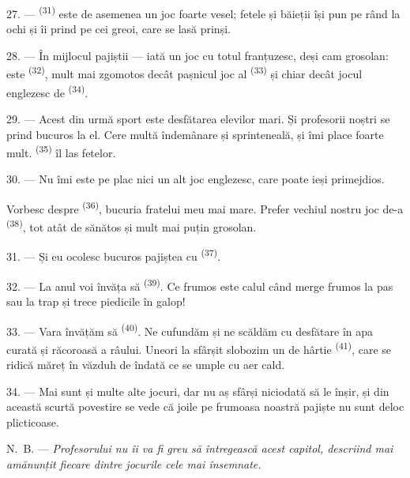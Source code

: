 27. ---  \textsuperscript{(31)} este de asemenea un joc foarte
vesel; fetele și băieții își pun pe rând  la ochi și îi prind pe
cei greoi, care se lasă prinși.

28. --- În mijlocul pajiștii --- iată un joc cu totul franțuzesc, deși cam
grosolan: este  \textsuperscript{(32)}, mult mai zgomotos decât
pașnicul joc al  \textsuperscript{(33)} și chiar decât jocul
englezesc de  \textsuperscript{(34)}.

29. --- Acest din urmă sport este desfătarea elevilor mari. Și profesorii noștri
se prind bucuros la el. Cere multă îndemânare și sprinteneală, și îmi place foarte
mult.  \textsuperscript{(35)} îl las fetelor.

30. --- Nu îmi este pe plac nici un alt joc englezesc, care poate ieși
primejdios.

Vorbesc despre  \textsuperscript{(36)}, bucuria fratelui meu mai
mare. Prefer vechiul nostru joc de-a  \textsuperscript{(38)}, tot
atât de sănătos și mult mai puțin grosolan.

\VUsaut{4.6mm}
\VUsaut{3.0mm}

31. --- Și eu ocolesc bucuros pajiștea cu 
\textsuperscript{(37)}.

32. --- La anul voi învăța să  \textsuperscript{(39)}. Ce frumos
este calul când merge frumos la pas sau la trap și trece piedicile în galop!

33. --- Vara învățăm să  \textsuperscript{(40)}. Ne cufundăm și ne
scăldăm cu desfătare în apa curată și răcoroasă a râului. Uneori la sfârșit
slobozim un  de hârtie \textsuperscript{(41)}, care se ridică
măreț în văzduh de îndată ce se umple cu aer cald.

34. --- Mai sunt și multe alte jocuri, dar nu aș sfârși niciodată să le înșir, și
din această scurtă povestire se vede că joile pe frumoasa noastră pajiște nu sunt
deloc plicticoase.

N.~B. --- \textit{Profesorului nu îi va fi greu să întregească acest capitol,
descriind mai amănunțit fiecare dintre jocurile cele mai însemnate.}
\VUsaut{6.0mm}
\VUfilet{22mm}
